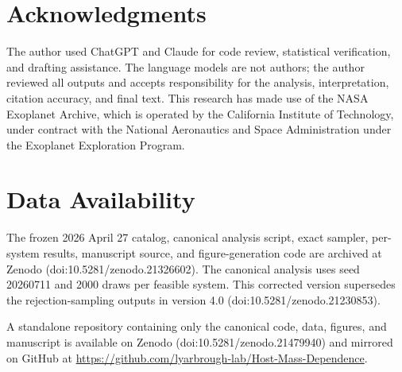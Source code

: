 \documentclass[twocolumn,linenumbers]{aastex631}
\begin{document}
\section{Acknowledgments}

The author used ChatGPT \citep{openai2026} and Claude
\citep{anthropic2026} for code review, statistical verification, and drafting
assistance. The language models are not authors; the author reviewed all
outputs and accepts responsibility for the analysis, interpretation, citation
accuracy, and final text. This research has made use of the NASA Exoplanet
Archive, which is operated by the California Institute of Technology, under
contract with the National Aeronautics and Space Administration under the
Exoplanet Exploration Program.



\section{Data Availability}

The frozen 2026 April 27 catalog, canonical analysis script, exact sampler,
per-system results, manuscript source, and figure-generation code are archived
at Zenodo (doi:10.5281/zenodo.21326602). The canonical analysis uses seed
20260711 and 2000 draws per feasible system. This corrected version supersedes
the rejection-sampling outputs in version 4.0
(doi:10.5281/zenodo.21230853).

A standalone repository containing only the canonical code, data, figures,
and manuscript is available on Zenodo
(doi:10.5281/zenodo.21479940) and mirrored on GitHub at
\url{https://github.com/lyarbrough-lab/Host-Mass-Dependence}.


\end{document}
